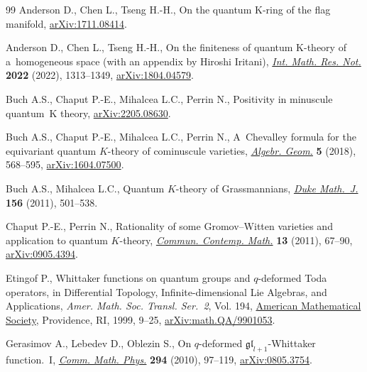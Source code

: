 \documentclass[11pt]{article}
\numberwithin{equation}{section}
\numberwithin{equation}{section}
\theoremstyle{definition}
\begin{document}
\begin{thebibliography}{99}
Anderson D., Chen L., Tseng H.-H., On the quantum {K}-ring of the flag manifold,
 \href{http://arxiv.org/abs/1711.08414}{arXiv:1711.08414}.

Anderson D., Chen L., Tseng H.-H., On the finiteness of quantum {K}-theory of
 a~homogeneous space (with an appendix by {H}iroshi {I}ritani),
 \href{https://doi.org/10.1093/imrn/rnaa108}{\textit{Int. Math. Res. Not.}}
 \textbf{2022} (2022), 1313--1349,
 \href{http://arxiv.org/abs/1804.04579}{arXiv:1804.04579}.

Buch A.S., Chaput P.-E., Mihalcea L.C., Perrin N., Positivity in minuscule
 quantum~{K} theory, \href{http://arxiv.org/abs/2205.08630}{arXiv:2205.08630}.

Buch A.S., Chaput P.-E., Mihalcea L.C., Perrin N., A~{C}hevalley formula for the
 equivariant quantum {$K$}-theory of cominuscule varieties,
 \href{https://doi.org/10.14231/ag-2018-015}{\textit{Algebr. Geom.}}
 \textbf{5} (2018), 568--595,
 \href{http://arxiv.org/abs/1604.07500}{arXiv:1604.07500}.

Buch A.S., Mihalcea L.C., Quantum {$K$}-theory of {G}rassmannians,
 \href{https://doi.org/10.1215/00127094-2010-218}{\textit{Duke Math.~J.}}
 \textbf{156} (2011), 501--538.

Chaput P.-E., Perrin N., Rationality of some {G}romov--{W}itten varieties and
 application to quantum {$K$}-theory,
 \href{https://doi.org/10.1142/S0219199711004166}{\textit{Commun. Contemp.
 Math.}} \textbf{13} (2011), 67--90,
 \href{http://arxiv.org/abs/0905.4394}{arXiv:0905.4394}.

Etingof P., Whittaker functions on quantum groups and {$q$}-deformed {T}oda
 operators, in Differential Topology, Infinite-dimensional {L}ie Algebras, and
 Applications, \textit{Amer. Math. Soc. Transl. Ser.~2}, Vol. 194,
 \href{https://doi.org/10.1090/trans2/194/02}{American Mathematical Society},
 Providence, RI, 1999, 9--25,
 \href{http://arxiv.org/abs/math.QA/9901053}{arXiv:math.QA/9901053}.

Gerasimov A., Lebedev D., Oblezin S., On {$q$}-deformed
 {${\mathfrak{gl}}_{l+1}$}-{W}hittaker function.~{I},
 \href{https://doi.org/10.1007/s00220-009-0917-y}{\textit{Comm. Math. Phys.}}
 \textbf{294} (2010), 97--119,
 \href{http://arxiv.org/abs/0805.3754}{arXiv:0805.3754}.


\end{thebibliography}
\end{document}
